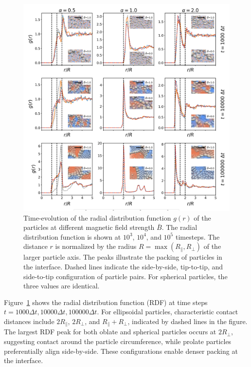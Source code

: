     \begin{figure}
    \centering
    \includegraphics[scale=0.4]{../figures/results/paper1/rdf_compare_time.png}
    \caption{Time-evolution of the radial distribution function $g(r)$ of the particles at different magnetic field strength $\bar{B}$. The radial 
    distribution function is shown at $10^3$, $10^4$, and $10^5$ timesteps. The distance $r$ is normalized by the radius $R=\max(R_\parallel,R_\perp)$ 
    of the larger particle axis. The peaks illustrate the packing of particles in the interface. Dashed lines indicate the side-by-side, tip-to-tip, and 
    side-to-tip configuration of particle pairs. For spherical particles, the three values are identical.}
    \label{fig:rdf}
    \end{figure}

Figure~\ref{fig:rdf} shows the radial distribution function (RDF) at time steps $t = 1000\Delta t, 10000\Delta t, 100000\Delta t$. 
For ellipsoidal particles, characteristic contact distances include \(2R_{\parallel}\), \(2R_{\perp}\), and \(R_{\parallel} + R_{\perp}\), 
indicated by dashed lines in the figure. The largest RDF peak for both oblate and spherical particles occurs at \(2R_\perp\), suggesting 
contact around the particle circumference, while prolate particles preferentially align side-by-side. These configurations enable denser 
packing at the interface.

